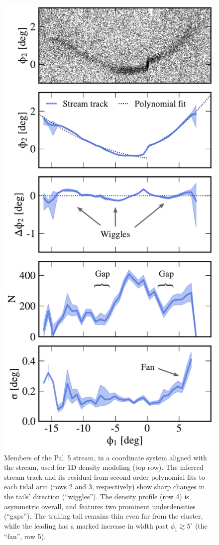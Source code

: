 \documentclass[twocolumn]{aastex62}
\begin{document}
\begin{figure}
\begin{center}
\includegraphics[width=0.8\columnwidth]{observed_profiles.pdf}
\end{center}
\caption{
Members of the Pal~5 stream, in a coordinate system aligned with the stream, used for 1D density modeling (top row).
The inferred stream track and its residual from second-order polynomial fits to each tidal arm (rows 2 and 3, respectively) show sharp changes in the tails' direction (``wiggles'').
The density profile (row 4) is asymmetric overall, and features two prominent underdensities (``gaps'').
The trailing tail remains thin even far from the cluster, while the leading has a marked increase in width past $\phi_1\gtrsim5^\circ$ (the ``fan'', row 5).
}
\label{fig:profiles}
\end{figure}
\end{document}
